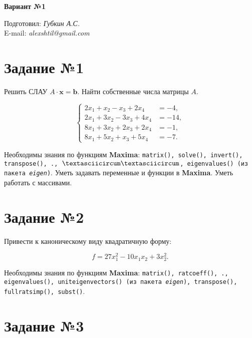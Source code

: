 \begin{center}
    \textbf{\huge Вариант №1}
\end{center}

\begin{flushright}
    Подготовил: \textit{Губкин А.С.}\\
    E-mail: \textit{alexshtil@gmail.com}\\
\end{flushright}

\section*{Задание №1}

    Решить СЛАУ $A \cdot \mathbf{x} = \mathbf{b}$. Найти собственные числа матрицы $A$.

    \[
        \left\{
            \begin{aligned}
                2 x_{1} + x_{2} - x_{3} + 2 x_{4} &= -4,\\
                2 x_{1} + 3 x_{2} - 3 x_{3} + 4 x_{4} &= -14,\\
                8 x_{1} + 3 x_{2} + 2 x_{3} + 2 x_{4} &= -1,\\
                8 x_{1} + 5 x_{2} + x_{3} + 5 x_{4} &= -7.
            \end{aligned}
        \right.
    \]
    
    Необходимы знания по функциям \textbf{Maxima}: {\tt matrix(), solve(), invert(), transpose(), ., $\textasciicircum \textasciicircum$, eigenvalues() (из пакета \textit{eigen})}. Уметь задавать переменные и функции в \textbf{Maxima}. Уметь работать с массивами.

\section*{Задание №2}

	Привести к каноническому виду квадратичную форму: 
	
	\[
		f = 27 x^{2}_{1} - 10 x_{1} x_{2} + 3 x^{2}_{2}.
	\]
	
	Необходимы знания по функциям \textbf{Maxima}: {\tt matrix(), ratcoeff(), ., eigenvalues(), uniteigenvectors() (из пакета \textit{eigen}), transpose(), fullratsimp(), subst()}.

\section*{Задание №3}

